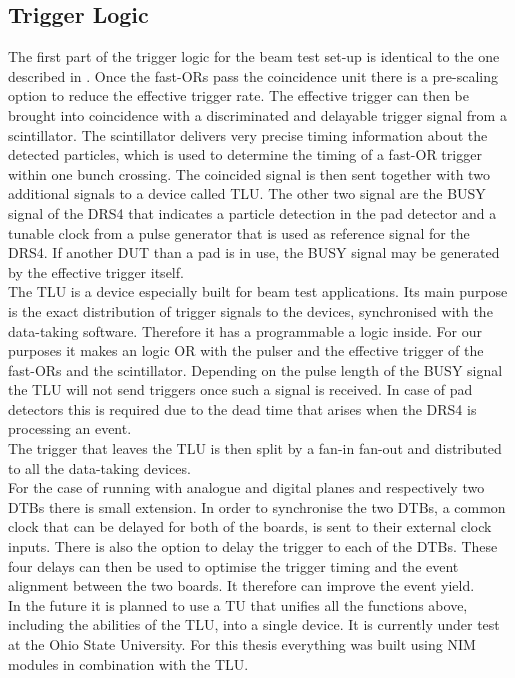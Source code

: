 \subsection{Trigger Logic}
The first part of the trigger logic for the beam test set-up is identical to the one described in . Once the fast-ORs pass the coincidence unit there is a pre-scaling option to reduce the effective trigger rate. The effective trigger can then be brought into coincidence with a discriminated and delayable trigger signal from a scintillator. The scintillator delivers very precise timing information about the detected particles, which is used to determine the timing of a fast-OR trigger within one bunch crossing. The coincided signal is then sent together with two additional signals to a device called \ac{TLU}. The other two signal are the BUSY signal of the DRS4 that indicates a particle detection in the pad detector and a tunable clock from a pulse generator that is used as reference signal for the DRS4. If another \ac{DUT} than a pad is in use, the BUSY signal may be generated by the effective trigger itself.\\
The \ac{TLU} is a device especially built for beam test applications. Its main purpose is the exact distribution of trigger signals to the devices, synchronised with the data-taking software. Therefore it has a programmable a logic inside. For our purposes it makes an logic OR with the pulser and the effective trigger of the fast-ORs and the scintillator. Depending on the pulse length of the BUSY signal the \ac{TLU} will not send triggers once such a signal is received. In case of pad detectors this is required due to the dead time that arises when the DRS4 is processing an event.\\
The trigger that leaves the \ac{TLU} is then split by a fan-in fan-out and distributed to all the data-taking devices. \\
For the case of running with analogue and digital planes and respectively two \ac{DTB}s there is small extension. In order to synchronise the two \ac{DTB}s, a common clock that can be delayed for both of the boards, is sent to their external clock inputs. There is also the option to delay the trigger to each of the \ac{DTB}s. These four delays can then be used to optimise the trigger timing and the event alignment between the two boards. It therefore can improve the event yield.\\
In the future it is planned to use a \ac{TU} that unifies all the functions above, including the abilities of the \ac{TLU}, into a single device. It is currently under test at the Ohio State University. For this thesis everything was built using NIM modules in combination with the \ac{TLU}.
